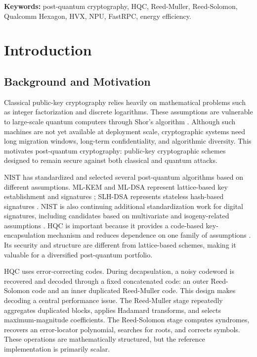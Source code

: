 \documentclass[12pt,a4paper]{report}
\begin{document}
\vspace{0.5cm}
\noindent\textbf{Keywords:} post-quantum cryptography, HQC, Reed-Muller, Reed-Solomon, Qualcomm Hexagon, HVX, NPU, FastRPC, energy efficiency.

\tableofcontents
\listoftables
\listoffigures
\clearpage
{}

\chapter{Introduction}

\section{Background and Motivation}
Classical public-key cryptography relies heavily on mathematical problems such as integer factorization and discrete logarithms. These assumptions are vulnerable to large-scale quantum computers through Shor's algorithm \cite{shor1999}. Although such machines are not yet available at deployment scale, cryptographic systems need long migration windows, long-term confidentiality, and algorithmic diversity. This motivates post-quantum cryptography: public-key cryptographic schemes designed to remain secure against both classical and quantum attacks.

NIST has standardized and selected several post-quantum algorithms based on different assumptions. ML-KEM and ML-DSA represent lattice-based key establishment and signatures \cite{nist-fips203,nist-fips204}; SLH-DSA represents stateless hash-based signatures \cite{nist-fips205}. NIST is also continuing additional standardization work for digital signatures, including candidates based on multivariate and isogeny-related assumptions \cite{nist-ads-2026,beullens2021,sqisign2020}. HQC is important because it provides a code-based key-encapsulation mechanism and reduces dependence on one family of assumptions \cite{nist-ir8545,hqc-spec}. Its security and structure are different from lattice-based schemes, making it valuable for a diversified post-quantum portfolio.

HQC uses error-correcting codes. During decapsulation, a noisy codeword is recovered and decoded through a fixed concatenated code: an outer Reed-Solomon code and an inner duplicated Reed-Muller code. This design makes decoding a central performance issue. The Reed-Muller stage repeatedly aggregates duplicated blocks, applies Hadamard transforms, and selects maximum-magnitude coefficients. The Reed-Solomon stage computes syndromes, recovers an error-locator polynomial, searches for roots, and corrects symbols. These operations are mathematically structured, but the reference implementation is primarily scalar.
\end{document}
